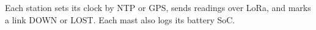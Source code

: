 \documentclass{article}
\begin{document}
Each station sets its clock by NTP or GPS, sends readings over LoRa, and marks a link DOWN or LOST.
Each mast also logs its battery SoC.
\end{document}
